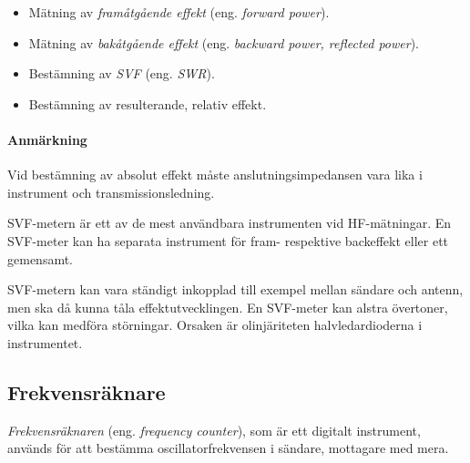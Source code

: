 \begin{itemize}
\item Mätning av \emph{framåtgående effekt} (eng. \emph{forward power}).
\item Mätning av \emph{bakåtgående effekt} (eng. \emph{backward power, reflected power}).
\item Bestämning av \emph{SVF} (eng. \emph{SWR}).
\item Bestämning av resulterande, relativ effekt.
\end{itemize}

\paragraph{Anmärkning} Vid bestämning av absolut effekt måste
anslutningsimpedansen vara lika i instrument och transmissionsledning.

SVF-metern är ett av de mest användbara instrumenten vid HF-mätningar.
En SVF-meter kan ha separata instrument för fram- respektive backeffekt eller
ett gemensamt.

SVF-metern kan vara ständigt inkopplad till exempel mellan sändare och antenn, men
ska då kunna tåla effektutvecklingen.
En SVF-meter kan alstra övertoner, vilka kan medföra störningar.
Orsaken är olinjäriteten halvledardioderna i instrumentet.

\subsection{Frekvensräknare}


\emph{Frekvensräknaren} (eng. \emph{frequency counter}), som är ett digitalt
instrument, används för att bestämma oscillatorfrekvensen i sändare,
mottagare med mera.

